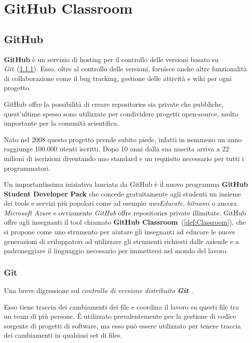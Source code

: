 
\chapter{GitHub Classroom}
	\section{GitHub}
		\textbf{GitHub} è un servizio di hosting per il controllo delle versioni basato su \textit{Git}~(\ref{def:Git}).
		Esso, oltre al controllo delle versioni, fornisce anche altre funzionalità di collaborazione come il bug tracking, gestione delle attività e wiki per ogni progetto.
		
		GitHub offre la possibilità di creare repositories sia private che pubbliche, quest'ultime spesso sono utilizzate per condividere progetti open-source, molto importante per la comunità scientifica.
		
		Nato nel 2008 questo progetto prende subito piede, infatti in nemmeno un anno raggiunge 100.000 utenti iscritti. Dopo 10 anni dalla sua nascita arriva a 22 milioni di iscrizioni diventando uno standard  e un requisito necessario per tutti i programmatori.
		
		Un importantissima iniziativa lanciata da GitHub è il nuovo programma \textbf{GitHub Student Developer Pack} che concede gratuitamente agli studenti un insieme dei tools e servizi più popolari come ad esempio \textit{awsEducate}, \textit{bitnami} o ancora \textit{Microsoft Azure} e ovviamente \textit{GitHub} offre repositories private illimitate.
		GitHub offre agli insegnanti il tool chiamato \textbf{GitHub Classroom}~(\ref{def:Classroom}), che si propone come uno strumento per aiutare gli insegnanti ad  educare le nuove generazioni di sviluppatori ad utilizzare gli strumenti richiesti dalle aziende e a padroneggiare il linguaggio necessario per immettersi nel mondo del lavoro.
	
		\subsection{Git}\label{def:Git}
			Una breve digressione sul \textit{controllo di versione distribuito \textbf{Git}}~\citep{ProGit2018}.
			
			Esso tiene traccia dei cambiamenti dei file e coordina il lavoro su questi file tra un team di più persone.
			\'E utilizzato prevalentemente per la gestione di codice sorgente di progetti di software, ma esso può essere utilizzato per tenere traccia dei cambiamenti in  qualsiasi set di files.
			
